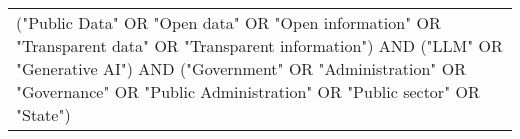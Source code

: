 \begin{table}[]
\begin{tabular}{|p{6cm}|}
("Public Data" OR "Open data" OR "Open information" OR "Transparent data" OR "Transparent information") AND ("LLM" OR "Generative AI") AND ("Government" OR "Administration" OR "Governance" OR "Public Administration" OR "Public sector" OR "State") \\
\end{tabular}
\end{table}